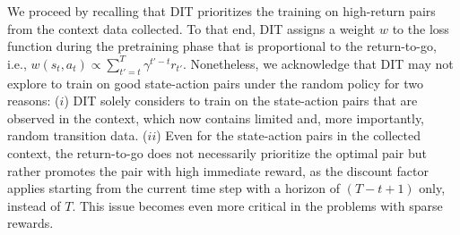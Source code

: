 We proceed by recalling that DIT prioritizes the training on high-return pairs from the context data collected. To that end, DIT assigns a weight $w$ to the loss function during the pretraining phase that is proportional to the return-to-go, i.e., 
$w(s_t, a_t) \propto \sum_{t'=t}^T \gamma^{t' - t} r_{t'}.$
Nonetheless, we acknowledge that DIT may not explore to train on good state-action pairs under the random policy for two reasons: ($i$) DIT solely considers to train on the state-action pairs that are observed in the context, which now contains limited and, more importantly, random transition data. 
%
($ii$) Even for the state-action pairs in the collected context, the return-to-go does not necessarily prioritize the optimal pair but rather promotes the pair with high immediate reward, as the discount factor applies starting from the current time step with a horizon of $(T-t+1)$ only, instead of $T$. This issue becomes even more critical in the problems with sparse rewards.
%









